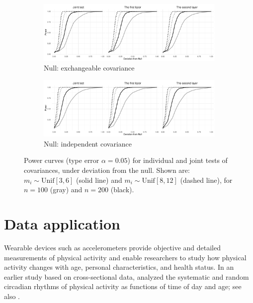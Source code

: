 \documentclass[submit]{smj}
\begin{document}
\begin{figure}[!h]
	\centering
	\begin{subfigure}{\textwidth}
		\centering
		\includegraphics[width=\linewidth]{Exch.pdf}
		\caption{Null: exchangeable covariance}
		\label{fig:sub1}
	\end{subfigure}%
	\baselineskip
	\begin{subfigure}{\textwidth}
		\centering
		\includegraphics[width=\linewidth]{Indep.pdf}
		\caption{Null: independent covariance}
		\label{fig:sub2}
	\end{subfigure}
	\caption{Power curves (type \uppercase\expandafter{} error $\alpha=0.05$) for individual and joint tests of covariances, under deviation from the null. Shown are:  $m_i \sim \text{Unif}[3,6]$ (solid line) and $m_i \sim \text{Unif}[8, 12]$ (dashed line), for $n=100$ (gray) and $n=200$ (black).}
	\label{power}
\end{figure}


\section{Data application}\label{sec:application}


Wearable devices such as accelerometers provide objective and detailed measurements of physical activity and enable researchers to study how physical activity changes with age, personal characteristics, and health status. In an earlier study based on cross-sectional data, \cite{Xiao2015} analyzed the systematic and random circadian rhythms of physical activity as functions of time of day and age; see also \cite{Goldsmith2015}.
\end{document}
